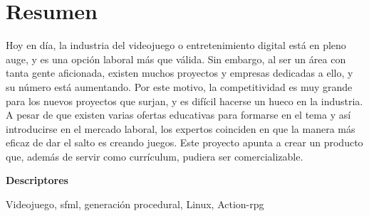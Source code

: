 \chapter*{Resumen}

Hoy en día, la industria del videojuego o entretenimiento digital está en pleno auge, y es una opción laboral más que válida. Sin embargo, al ser un área con tanta gente aficionada, existen muchos proyectos y empresas dedicadas a ello, y su número está aumentando. Por este motivo, la competitividad es muy grande para los nuevos proyectos que surjan, y es difícil hacerse un hueco en la industria. A pesar de que existen varias ofertas educativas para formarse en el tema y así introducirse en el mercado laboral, los expertos coinciden en que la manera más eficaz de dar el salto es creando juegos. Este proyecto apunta a crear un producto que, además de servir como currículum, pudiera ser comercializable.

\vspace{2em}

{\Large\bfseries\sffamily Descriptores}
\vspace{3\medskipamount}

Videojuego, \acrshort{sfml}, generación procedural, Linux, Action-\acrshort{rpg}